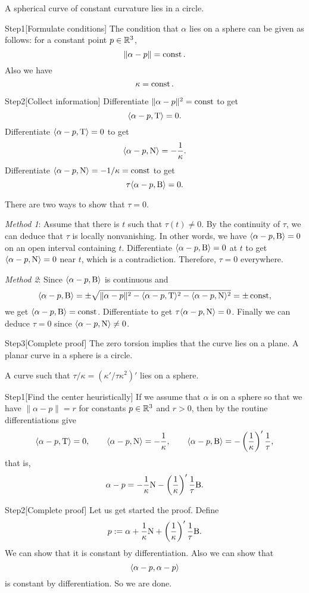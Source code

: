 \documentclass{../../large}
\def\a{\alpha}
\def\Step{Step}
\begin{document}
\begin{prb}
A spherical curve of constant curvature lies in a circle.
\end{prb}
\begin{sol}
\Step{1}[Formulate conditions]
The condition that $\a$ lies on a sphere can be given as follows: for a constant point $p\in\mathbb{R}^3$,
\[\|\a-p\|=\const.\]
Also we have
\[\kappa=\operatorname{const}.\]

\Step{2}[Collect information]
Differentiate $\|\a-p\|^2=\const$ to get
\[\<\a-p,\rT\>=0.\]
Differentiate $\<\a-p,\rT\>=0$ to get
\[\<\a-p,\rN\>=-\frac1\kappa.\]
Differentiate $\<\a-p,\rN\>=-1/\kappa=\const$ to get
\[\tau\<\a-p,\rB\>=0.\]

There are two ways to show that $\tau=0$.

\emph{Method 1}:
Assume that there is $t$ such that $\tau(t)\ne0$.
By the continuity of $\tau$, we can deduce that $\tau$ is locally nonvanishing.
In other words, we have $\<\a-p,\rB\>=0$ on an open interval containing $t$.
Differentiate $\<\a-p,\rB\>=0$ at $t$ to get $\<\a-p,\rN\>=0$ near $t$, which is a contradiction.
Therefore, $\tau=0$ everywhere.

\emph{Method 2}:
Since $\<\a-p,\rB\>$ is continuous and
\[\<\a-p,\rB\>=\pm\sqrt{\|\a-p\|^2-\<\a-p,\rT\>^2-\<\a-p,\rN\>^2}=\pm\const,\]
we get $\<\a-p,\rB\>=\const$.
Differentiate to get $\tau\<\a-p,\rN\>=0$.
Finally we can deduce $\tau=0$ since $\<\a-p,\rN\>\ne0$.

\Step{3}[Complete proof]
The zero torsion implies that the curve lies on a plane.
A planar curve in a sphere is a circle.
\end{sol}

\begin{prb}
A curve such that $\tau/\kappa=(\kappa'/\tau\kappa^2)'$ lies on a sphere.
\end{prb}
\begin{sol}
\Step{1}[Find the center heuristically]
If we assume that $\a$ is on a sphere so that we have $\|\a-p\|=r$ for constants $p\in\mathbb{R}^3$ and $r>0$, then by the routine differentiations give
\[\<\a-p,\rT\>=0,\qquad\<\a-p,\rN\>=-\frac1\kappa,\qquad\<\a-p,\rB\>=-\left(\frac1\kappa\right)'\frac1\tau,\]
that is,
\[\a-p=-\frac1\kappa\rN-\left(\frac1\kappa\right)'\frac1\tau\rB.\]

\Step{2}[Complete proof]
Let us get started the proof.
Define
\[p:=\a+\frac1\kappa\rN+\left(\frac1\kappa\right)'\frac1\tau\rB.\]
We can show that it is constant by differentiation.
Also we can show that
\[\<\a-p,\a-p\>\]
is constant by differentiation.
So we are done.
\end{sol}
\end{document}

